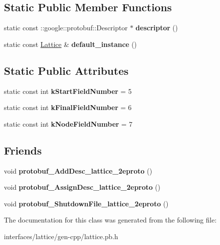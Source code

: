 \subsection*{Static Public Member Functions}
\begin{DoxyCompactItemize}
\item 
\hypertarget{classlattice_1_1Lattice_a71a7f65293ee5359341d0a5beb1d7b5f}{
static const ::google::protobuf::Descriptor $\ast$ {\bfseries descriptor} ()}
\label{classlattice_1_1Lattice_a71a7f65293ee5359341d0a5beb1d7b5f}

\item 
\hypertarget{classlattice_1_1Lattice_a81ac4cf92ddb448fa55c03fa779765fb}{
static const \hyperlink{classlattice_1_1Lattice}{Lattice} \& {\bfseries default\_\-instance} ()}
\label{classlattice_1_1Lattice_a81ac4cf92ddb448fa55c03fa779765fb}

\end{DoxyCompactItemize}
\subsection*{Static Public Attributes}
\begin{DoxyCompactItemize}
\item 
\hypertarget{classlattice_1_1Lattice_a43c82461b5757da3dec815f9a1918546}{
static const int {\bfseries kStartFieldNumber} = 5}
\label{classlattice_1_1Lattice_a43c82461b5757da3dec815f9a1918546}

\item 
\hypertarget{classlattice_1_1Lattice_a41954f413ffb07063a80fb779f7b825b}{
static const int {\bfseries kFinalFieldNumber} = 6}
\label{classlattice_1_1Lattice_a41954f413ffb07063a80fb779f7b825b}

\item 
\hypertarget{classlattice_1_1Lattice_aef2900e37da8f683285328c24b5e6b16}{
static const int {\bfseries kNodeFieldNumber} = 7}
\label{classlattice_1_1Lattice_aef2900e37da8f683285328c24b5e6b16}

\end{DoxyCompactItemize}
\subsection*{Friends}
\begin{DoxyCompactItemize}
\item 
\hypertarget{classlattice_1_1Lattice_a19e63fb37025879e023cad88064187cf}{
void {\bfseries protobuf\_\-AddDesc\_\-lattice\_\-2eproto} ()}
\label{classlattice_1_1Lattice_a19e63fb37025879e023cad88064187cf}

\item 
\hypertarget{classlattice_1_1Lattice_a3b0386e09a9fefcf1bdce658cfc480b2}{
void {\bfseries protobuf\_\-AssignDesc\_\-lattice\_\-2eproto} ()}
\label{classlattice_1_1Lattice_a3b0386e09a9fefcf1bdce658cfc480b2}

\item 
\hypertarget{classlattice_1_1Lattice_a3c7b187721d0704ceb19ff889729d35a}{
void {\bfseries protobuf\_\-ShutdownFile\_\-lattice\_\-2eproto} ()}
\label{classlattice_1_1Lattice_a3c7b187721d0704ceb19ff889729d35a}

\end{DoxyCompactItemize}


The documentation for this class was generated from the following file:\begin{DoxyCompactItemize}
\item 
interfaces/lattice/gen-\/cpp/lattice.pb.h\end{DoxyCompactItemize}
